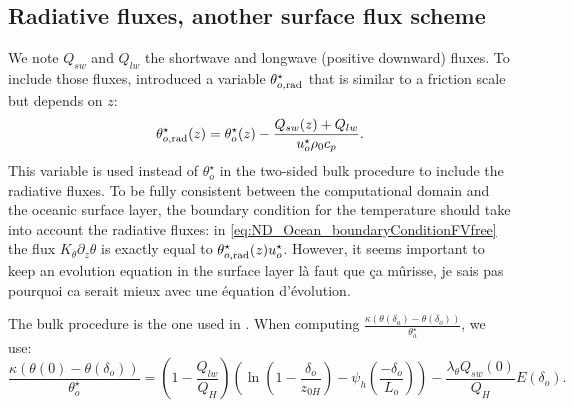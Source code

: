 \subsection{Radiative fluxes, another surface flux scheme}
\label{sec:ND_Ocean_radiativeFluxes}
We note $Q_{sw}$ and $Q_{lw}$ the shortwave and longwave (positive
downward) fluxes.
To include those fluxes, \cite{pelletier_two-sided_2021} introduced
a variable $\theta^\star_{o, \rm rad}$
that is similar to a friction scale but depends on $z$:
\begin{equation}
\theta^\star_{o, \rm rad}(z) =
	\theta^\star_{o}(z) -
	\frac{Q_{sw}(z) + Q_{lw}}{u^{\star}_o\rho_0 c_p}.
\end{equation}
This variable is used instead of $\theta^\star_{o}$
in the two-sided bulk procedure to include the radiative fluxes.
To be fully consistent between the computational domain and
the oceanic surface layer, the boundary condition for the temperature
should take into account the radiative fluxes: in
\eqref{eq:ND_Ocean_boundaryConditionFVfree} the flux
$K_\theta \partial_z \theta$ is exactly equal to
$\theta^\star_{o, \rm rad}(z) u^\star_{o}$.
However, it seems important to keep an evolution equation
in the surface layer {\color{red} là faut que ça mûrisse,
je sais pas pourquoi ca serait mieux avec une équation d'évolution}.
%
\par
The bulk procedure is the one used in
\citep{pelletier_two-sided_2021}.
When computing
$\frac{\kappa (\theta(\delta_a) - \theta(\delta_o))}
	{\theta_a^{\star}}$,
	we use:
\begin{equation}
	\label{eq:ND_Ocean_skinbulk}
	\frac{\kappa (\theta(0) - \theta(\delta_o))}
	{\theta_o^{\star}} = (1 -
	\frac{Q_{lw}}{Q_H})
	\left(\ln (1 - \frac{\delta_o}{z_{0H}}) -
	\psi_h(\frac{-\delta_o}{L_o})\right)
	- \frac{\lambda_\theta Q_{sw}(0)}
	{Q_H} E(\delta_o).
\end{equation}
